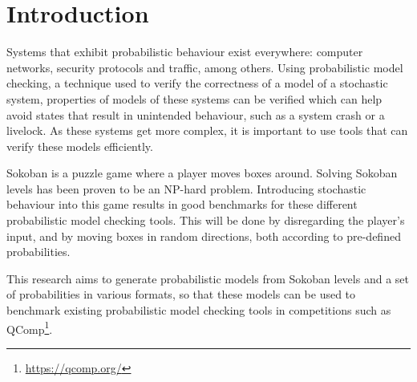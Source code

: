 \section{Introduction}
Systems that exhibit probabilistic behaviour exist everywhere: computer networks, security protocols and traffic, among others. Using probabilistic model checking, a technique used to verify the correctness of a model of a stochastic system, properties of models of these systems can be verified which can help avoid states that result in unintended behaviour, such as a system crash or a livelock. As these systems get more complex, it is important to use tools that can verify these models efficiently.

Sokoban is a puzzle game where a player moves boxes around. Solving Sokoban levels has been proven to be an NP-hard problem\cite{sokoban-np}. Introducing stochastic behaviour into this game results in good benchmarks for these different probabilistic model checking tools. This will be done by disregarding the player's input, and by moving boxes in random directions, both according to pre-defined probabilities.

This research aims to generate probabilistic models from Sokoban levels and a set of probabilities in various formats, so that these models can be used to benchmark existing probabilistic model checking tools in competitions such as QComp\footnote{\url{https://qcomp.org/}}.
